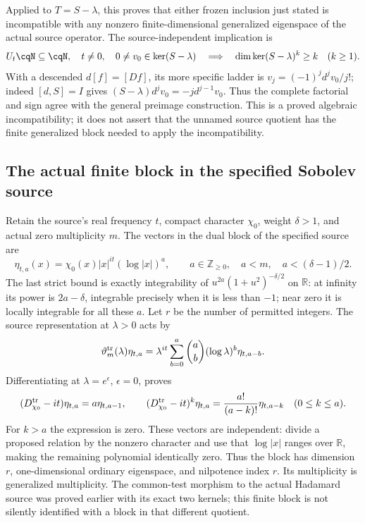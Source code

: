 Applied to $T=S-\lambda$, this proves that either frozen
inclusion just stated is incompatible with any nonzero
finite-dimensional generalized eigenspace of the actual source
operator. The source-independent implication is
\begin{equation}
\begin{gathered}
 U_t\cqN\subseteq\cqN,\quad t\ne0,\quad
                  0\ne v_0\in\ker(S-\lambda)
 \quad\Longrightarrow\quad
 \dim\ker(S-\lambda)^k\geq k\quad(k\geq1).
\end{gathered}
\label{eq:cq-source-surjective-chain}
\end{equation}
With a descended $d[f]=[Df]$, its more specific ladder is
$v_j=(-1)^jd^jv_0/j!$; indeed
$[d,S]=I$ gives $(S-\lambda)d^jv_0=-j d^{j-1}v_0$.
Thus the complete factorial and sign agree with the general
preimage construction. This is a proved algebraic incompatibility;
it does not assert that the unnamed source quotient has the
finite generalized block needed to apply the incompatibility.

\subsection{The actual finite block in the specified Sobolev source}

Retain the source's real frequency $t$, compact character $\chi_0$,
weight $\delta>1$, and actual zero multiplicity $m$.
The vectors in the dual block of the specified source are
\[
 \eta_{t,a}(x)=\chi_0(x)|x|^{it}(\log|x|)^a,\qquad
 a\in\mathbb Z_{\geq0},\quad a<m,\quad a<(\delta-1)/2 .
\]
The last strict bound is exactly integrability of
$u^{2a}(1+u^2)^{-\delta/2}$ on $\mathbb R$: at infinity
its power is $2a-\delta$, integrable precisely when it is
less than $-1$; near zero it is locally integrable for all
these $a$. Let $r$ be the number of permitted integers.
The source representation at $\lambda>0$ acts by
\[
 \vartheta_m^{\rm tr}(\lambda)\eta_{t,a}
 =\lambda^{it}\sum_{b=0}^a\binom ab(\log\lambda)^b\eta_{t,a-b}.
\]
Differentiating at $\lambda=e^\epsilon$, $\epsilon=0$, proves
\begin{equation}
 (D_{\chi_0}^{\rm tr}-it)\eta_{t,a}=a\eta_{t,a-1},\qquad
 (D_{\chi_0}^{\rm tr}-it)^k\eta_{t,a}
 =\frac{a!}{(a-k)!}\eta_{t,a-k}\quad(0\leq k\leq a).
 \label{eq:cq-source-Sobolev-Jordan-block}
\end{equation}
For $k>a$ the expression is zero. These vectors are independent:
divide a proposed relation by the nonzero character and use
that $\log|x|$ ranges over $\mathbb R$, making the remaining
polynomial identically zero. Thus the block has dimension
$r$, one-dimensional ordinary eigenspace, and nilpotence
index $r$. Its multiplicity is generalized multiplicity.
The common-test morphism to the actual Hadamard source was
proved earlier with its exact two kernels; this finite
block is not silently identified with a block in that
different quotient.

